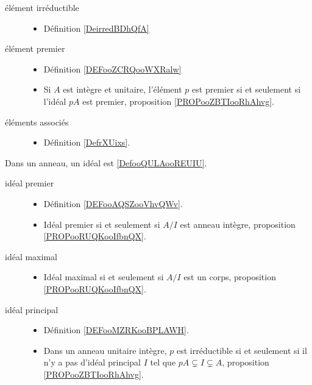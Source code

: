 \begin{description}
	\item[élément irréductible]\hspace{1cm}
	\begin{itemize}
		\item Définition \ref{DeirredBDhQfA}
	\end{itemize}
	\item[élément premier]\hspace{1cm}
	\begin{itemize}
		\item Définition \ref{DEFooZCRQooWXRalw}
		\item
		      Si \( A\) est intègre et unitaire, l'élément \( p\) est premier si et seulement si l'idéal \( pA\) est premier, proposition \ref{PROPooZBTIooRhAhvg}.
	\end{itemize}
	\item[éléments associés]\hspace{1cm}
	\begin{itemize}
		\item Définition \ref{DefrXUixs}.
	\end{itemize}
\end{description}

Dans un anneau, un idéal est \ref{DefooQULAooREUIU}.
\begin{description}
	\item[idéal premier]\hspace{1cm}
	\begin{itemize}
		\item
		      Définition \ref{DEFooAQSZooVhvQWv}.
		\item Idéal premier si et seulement si \( A/I\) est anneau intègre, proposition \ref{PROPooRUQKooIfbnQX}.
	\end{itemize}
	\item[idéal maximal]\hspace{1cm}
	\begin{itemize}
		\item
		      Idéal maximal si et seulement si \( A/I\) est un corps, proposition \ref{PROPooRUQKooIfbnQX}.
	\end{itemize}
	\item[idéal principal]\hspace{1cm}
	\begin{itemize}
		\item
		      Définition \ref{DEFooMZRKooBPLAWH}.
		\item
		      Dans un anneau unitaire intègre, \( p\) est irréductible si et seulement si il n'y a pas d'idéal principal \( I\) tel que \( pA\subsetneq I\subsetneq A\), proposition \ref{PROPooZBTIooRhAhvg}.
	\end{itemize}
\end{description}
